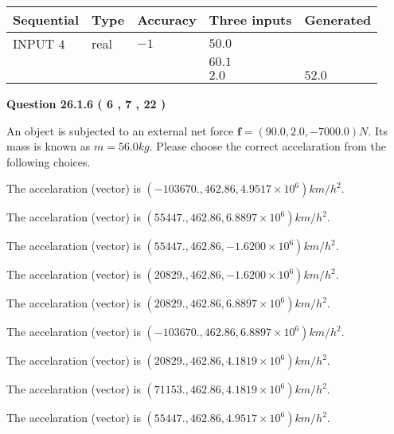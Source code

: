 \documentclass[12pt]{article}
\begin{document}
   
  
  
\noindent\begin{tabular}{|l|l|l|l|l|}
\hline
 Sequential & Type & Accuracy & Three inputs & Generated \\ 
\hline
 
 
  INPUT $            4 $ & real & $           -1  $ & $
 50.0
  $ & \\
  & & &  $
 60.1
  $ & \\
  & & &  $
 2.0
 $ & $ 52.0 $ 
 \\  \hline  
 \end{tabular}
   
   
  
\vspace{0.2in}
  
{\textbf{\Large{Question
26.1.6 
 (           6 ,           7 ,          22 )
}}}
  
  
 
An object is subjected to an external net force $\mathbf{f}=(
90.0 ,
2.0,
-7000.0  )N$. Its mass is known as
$m= %
56.0  kg$. Please choose the correct accelaration
from the following choices.
 
 
 
The accelaration (vector) is
$(
-103670.,
462.86 ,
4.9517 \times 10^{6}
)km/h^2.
$
 
 
The accelaration (vector) is
$(
55447.,
462.86 ,
6.8897 \times 10^{6}
)km/h^2.
$
 
 
The accelaration (vector) is
$(
55447.,
462.86 ,
-1.6200 \times 10^{6}
)km/h^2.
$
 
 
The accelaration (vector) is
$(
20829.,
462.86 ,
-1.6200 \times 10^{6}
)km/h^2.
$
 
 
The accelaration (vector) is
$(
20829.,
462.86 ,
6.8897 \times 10^{6}
)km/h^2.
$
 
 
The accelaration (vector) is
$(
-103670.,
462.86 ,
6.8897 \times 10^{6}
)km/h^2.
$
 
 
The accelaration (vector) is
$(
20829.,
462.86 ,
4.1819 \times 10^{6}
)km/h^2.
$
 
 
The accelaration (vector) is
$(
71153.,
462.86 ,
4.1819 \times 10^{6}
)km/h^2.
$
 
 
The accelaration (vector) is
$(
55447.,
462.86 ,
4.9517 \times 10^{6}
)km/h^2.
$
 
\end{document}
